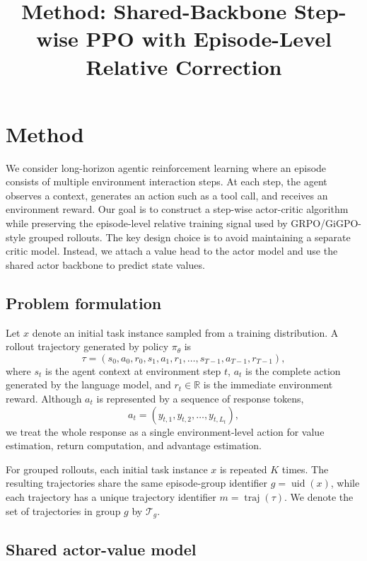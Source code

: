 \documentclass[10pt]{article}
\title{Method: Shared-Backbone Step-wise PPO with Episode-Level Relative Correction}
\author{}
\date{}
\newcommand{\uid}{\operatorname{uid}}
\newcommand{\traj}{\operatorname{traj}}
\begin{document}
\maketitle
\vspace{-1.5em}

\section*{Method}

We consider long-horizon agentic reinforcement learning where an episode consists of multiple environment interaction steps. At each step, the agent observes a context, generates an action such as a tool call, and receives an environment reward. Our goal is to construct a step-wise actor-critic algorithm while preserving the episode-level relative training signal used by GRPO/GiGPO-style grouped rollouts. The key design choice is to avoid maintaining a separate critic model. Instead, we attach a value head to the actor model and use the shared actor backbone to predict state values.

\subsection*{Problem formulation}

Let $x$ denote an initial task instance sampled from a training distribution. A rollout trajectory generated by policy $\pi_\theta$ is
\[
\tau = (s_0,a_0,r_0,s_1,a_1,r_1,\ldots,s_{T-1},a_{T-1},r_{T-1}),
\]
where $s_t$ is the agent context at environment step $t$, $a_t$ is the complete action generated by the language model, and $r_t\in\mathbb{R}$ is the immediate environment reward. Although $a_t$ is represented by a sequence of response tokens,
\[
a_t = (y_{t,1},y_{t,2},\ldots,y_{t,L_t}),
\]
we treat the whole response as a single environment-level action for value estimation, return computation, and advantage estimation.

For grouped rollouts, each initial task instance $x$ is repeated $K$ times. The resulting trajectories share the same episode-group identifier $g=\uid(x)$, while each trajectory has a unique trajectory identifier $m=\traj(\tau)$. We denote the set of trajectories in group $g$ by $\mathcal{T}_g$.

\subsection*{Shared actor-value model}
\end{document}
